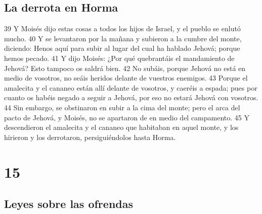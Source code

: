 \section*{La derrota en Horma }

39 Y Moisés dijo estas cosas a todos los hijos de Israel, y el pueblo se enlutó mucho.
40 Y se levantaron por la mañana y subieron a la cumbre del monte, diciendo: Henos aquí para subir al lugar del cual ha hablado Jehová; porque hemos pecado.
41 Y dijo Moisés: ¿Por qué quebrantáis el mandamiento de Jehová? Esto tampoco os saldrá bien.
42 No subáis, porque Jehová no está en medio de vosotros, no seáis heridos delante de vuestros enemigos.
43 Porque el amalecita y el cananeo están allí delante de vosotros, y caeréis a espada; pues por cuanto os habéis negado a seguir a Jehová, por eso no estará Jehová con vosotros.
44 Sin embargo, se obstinaron en subir a la cima del monte; pero el arca del pacto de Jehová, y Moisés, no se apartaron de en medio del campamento.
45 Y descendieron el amalecita y el cananeo que habitaban en aquel monte, y los hirieron y los derrotaron, persiguiéndolos hasta Horma.

\chapter{15}

\section*{Leyes sobre las ofrendas}

